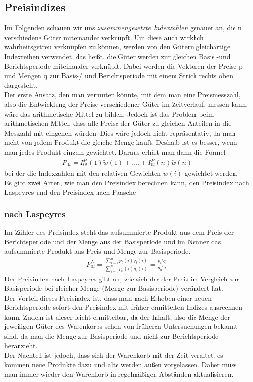 \documentclass[a4paper]{article}
\begin{document}
\subsection{Preisindizes}
Im Folgenden schauen wir uns \textit{zusammengesetzte Indexzahlen} genauer an, die n verschiedene Güter miteinander verknüpft. Um diese auch wirklich wahrheitsgetreu verknüpfen zu können, werden von den Gütern gleichartige Indexreihen verwendet, das heißt, die Güter werden zur gleichen Basis -und Berichtsperiode miteinander verknüpft. Dabei werden die Vektoren der Preise p und Mengen q zur Basis-/ und Berichtsperiode mit einem Strich rechts oben dargestellt.\\
Der erste Ansatz, den man vermuten könnte, mit dem man eine Preismesszahl, also die Entwicklung der Preise verschiedener Güter im Zeitverlauf, messen kann, wäre das arithmetische Mittel zu bilden. Jedoch ist das Problem beim arithmetischen Mittel, dass alle Preise der Güter zu gleichen Anteilen in die Messzahl mit eingehen würden. Dies wäre jedoch nicht repräsentativ, da man nicht von jedem Produkt die gleiche Menge kauft. Deshalb ist es besser, wenn man jedes Produkt einzeln gewichtet. Daraus erhält man dann die Formel \begin{align*}
    P_{0t}=I_{0t}^P(1) \tilde w(1)+....+I_{0t}^P(n)\tilde w (n)
\end{align*}
bei der die Indexzahlen mit den relativen Gewichten $\tilde w(i)$ gewichtet werden.\\
Es gibt zwei Arten, wie man den Preisindex berechnen kann, den Preisindex nach Laspeyres und den Preisindex nach Paasche

\subsubsection{nach Laspeyres}\label{PI nach Laspeyres}
Im Zähler des Preisindex steht das aufsummierte Produkt aus dem Preis der Berichtsperiode und der Menge aus der Basisperiode und im Nenner das aufsummierte Produkt aus Preis und Menge zur Basisperiode.
\begin{align*}
    P_{0t}^L =\frac{\sum_{i=1}^n p_t(i)q_0(i)}{\sum_{i=1}^n p_0(i)q_0(i)} =\frac{p_t'q_0}{p_0'q_0}
\end{align*}
Der Preisindex nach Laspeyres gibt an, wie sich der der Preis im Vergleich zur Basisperiode bei gleicher Menge (Menge zur Basisperiode) verändert hat. \\
Der Vorteil dieses Preisindex ist, dass man nach Erheben einer neuen Berichtsperiode sofort den Preisindex mit früher ermittelten Indizes ausrechnen kann. Zudem ist dieser leicht ermittelbar, da der Inhalt, also die Menge der jeweiligen Güter des Warenkorbs schon von früheren Untersuchungen bekannt sind, da man die Menge zur Basisperiode und nicht zur Berichtsperiode heranzieht.\\
Der Nachteil ist jedoch, dass sich der Warenkorb mit der Zeit veraltet, es kommen neue Produkte dazu und alte werden außen vorgelassen. Daher muss man immer wieder den Warenkorb in regelmäßigen Abständen aktualisieren.
\end{document}
